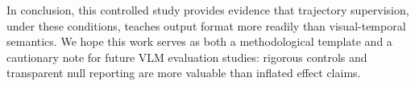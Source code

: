 In conclusion, this controlled study provides evidence that trajectory supervision, under these conditions, teaches output format more readily than visual-temporal semantics. We hope this work serves as both a methodological template and a cautionary note for future VLM evaluation studies: rigorous controls and transparent null reporting are more valuable than inflated effect claims.
